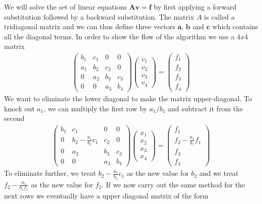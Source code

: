 \documentclass[12pt]{article}
\numberwithin{equation}{section}     %
\begin{document}
We will solve the set of linear equations $\mathbf{Av=f}$ by first applying a forward substitution followed by a backward substitution. The matrix $A$ is called a tridiagonal matrix and we can thus define three vectors $\boldsymbol{a}$, $\boldsymbol{b}$ and $\boldsymbol{c}$ which contains all the diagonal terms. In order to show the flow of the algorithm we use a $4x4$ matrix
\begin{align*}
    \begin{pmatrix}
 b_1&  c_1&  0& 0\\
 a_1&  b_2&  c_2& 0\\
 0&  a_2&  b_3& c_3\\
 0&  0&  a_3& b_4
\end{pmatrix}
\begin{pmatrix}
v_1\\
v_2\\
v_3\\
v_4
\end{pmatrix}
=
\begin{pmatrix}
f_1\\
f_2\\
f_3\\
f_4
\end{pmatrix}
\end{align*}
We want to eliminate the lower diagonal to make the matrix upper-diagonal. To knock out $a_1$, we can multiply the first row by $a_1/b_1$ and subtract it from the second
\begin{align*}
    \begin{pmatrix}
 b_1&  c_1&  0& 0\\
 0&  b_2-\frac{a_1}{b_1}c_1&  c_2& 0\\
 0&  a_2&  b_3& c_3\\
 0&  0&  a_3& b_4
\end{pmatrix}
\begin{pmatrix}
x_1\\
x_2\\
x_3\\
x_4
\end{pmatrix}
=
\begin{pmatrix}
f_1\\
f_2-\frac{a_1}{b_1}f_1\\
f_3\\
f_4
\end{pmatrix}
\end{align*}
To eliminate further, we treat $b_2-\frac{a_1}{b_1}c_1$ as the new value for $b_2$ and we treat $f_{2}-\frac{a_{1}}{b_{1}f_{1}}$ as the new value for $f_{2}$. If we now carry out the same method for the next rows we eventually have a upper diagonal matrix of the form
\end{document}
